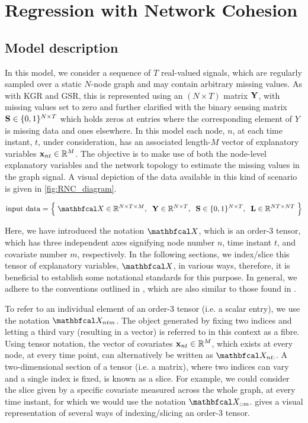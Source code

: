 \section{Regression with Network Cohesion}

\label{sec:rnc_mdp}

\subsection{Model description}

In this model, we consider a sequence of $T$ real-valued signals, which are regularly sampled over a static $N$-node graph and may contain arbitrary missing values. As with KGR and GSR, this is represented using an $(N \times T)$ matrix $\mathbf{Y}$, with missing values set to zero and further clarified with the binary sensing matrix $\mathbf{S} \in \{0, 1\}^{N \times T}$ which holds zeros at entries where the corresponding element of $Y$ is missing data and ones elsewhere. In this model each node, $n$, at each time instant, $t$, under consideration, has an associated length-$M$ vector of explanatory variables $\mathbf{x}_{nt} \in \mathbb{R}^{M}$. The objective is to make use of both the node-level explanatory variables and the network topology to estimate the missing values in the graph signal. A visual depiction of the data available in this kind of scenario is given in \cref{fig:RNC_diagram}. 

\begin{equation*}
    \text{input data} = \Big\{ \;\Xt \in \R^{N \times T \times M}, \;\; \Y \in \R^{N \times T}, \;\; \Ss \in \{0, 1\}^{N \times T}, \;\; \LL \in \R^{NT \times NT} \; \Big\}
\end{equation*}

Here, we have introduced the notation $\Xt$, which is an order-3 tensor, which has three independent axes signifying node number $n$, time instant $t$, and covariate number $m$, respectively. In the following sections, we index/slice this tensor of explanatory variables, $\Xt$, in various ways, therefore, it is beneficial to establish some notational standards for this purpose. In general, we adhere to the conventions outlined in \cite{Kolda2009}, which are also similar to those found in \cite{Kiers2000}. 

To refer to an individual element of an order-3 tensor (i.e. a scalar entry), we use the notation $\Xt_{ntm}$. The object generated by fixing two indices and letting a third vary (resulting in a vector) is referred to in this context as a fibre. Using tensor notation, the vector of covariates $\mathbf{x}_{nt} \in \mathbb{R}^{M}$, which exists at every node, at every time point, can alternatively be written as $\Xt_{nt:}$. A two-dimensional section of a tensor (i.e. a matrix), where two indices can vary and a single index is fixed, is known as a slice. For example, we could consider the slice given by a specific covariate measured across the whole graph, at every time instant, for which we would use the notation $\Xt_{::m}$.  gives a visual representation of several ways of indexing/slicing an order-3 tensor. 


